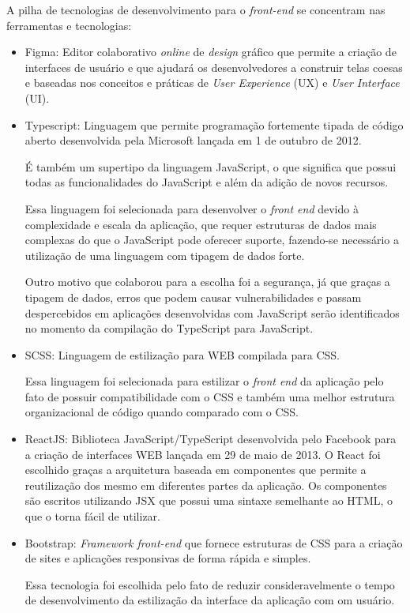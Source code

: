 \documentclass[
    12pt,               %
    openright,          %
    oneside,
    a4paper,            %
    BIBLATEX,           %
    TODO,               %
    english,            %
    brazil              %
    ]{ifsp-spo-inf-ctds}
\begin{document}
        A pilha de tecnologias de desenvolvimento para o \emph{front-end} se concentram nas ferramentas e tecnologias:

        \begin{itemize}

            \item Figma: Editor colaborativo \emph{online} de \emph{design} gráfico que permite a criação de interfaces de usuário e que ajudará os desenvolvedores a construir telas coesas e baseadas nos conceitos e práticas de \emph{User Experience} (UX) e \emph{User Interface} (UI).

            \item Typescript:
                Linguagem que permite programação fortemente tipada de código aberto desenvolvida pela Microsoft lançada em 1 de outubro de 2012. 

                É também um supertipo da linguagem  JavaScript, o que significa que possui todas as funcionalidades do JavaScript e além da adição de novos recursos. 

                Essa linguagem foi selecionada para desenvolver o \emph{front end} devido à complexidade e escala da aplicação, que requer estruturas de dados mais complexas do que o JavaScript pode oferecer suporte, fazendo-se necessário a utilização de uma linguagem com tipagem de dados forte. 

                Outro motivo que colaborou para a escolha foi a segurança, já que graças a tipagem de dados, erros que podem causar vulnerabilidades e passam despercebidos em aplicações desenvolvidas com JavaScript serão identificados no momento da compilação do TypeScript para JavaScript.

            \item SCSS:
                Linguagem de estilização para WEB compilada para CSS.

                Essa linguagem foi selecionada para estilizar o \emph{front end} da aplicação pelo fato de possuir compatibilidade com o CSS e também uma melhor estrutura organizacional de código quando comparado com o CSS.

            \item ReactJS:
                Biblioteca JavaScript/TypeScript desenvolvida pelo Facebook para a criação de interfaces WEB lançada em 29 de maio de 2013. O React foi escolhido graças a arquitetura baseada em componentes que permite a reutilização dos mesmo em diferentes partes da aplicação. Os componentes são escritos utilizando JSX que possui uma sintaxe semelhante ao HTML, o que o torna fácil de utilizar.

            \item Bootstrap:
                \emph{Framework front-end} que fornece estruturas de CSS para a criação de sites e aplicações responsivas de forma rápida e simples.

                Essa tecnologia foi escolhida pelo fato de reduzir consideravelmente o tempo de desenvolvimento da estilização da interface da aplicação com om usuário.

        \end{itemize}  
\end{document}
